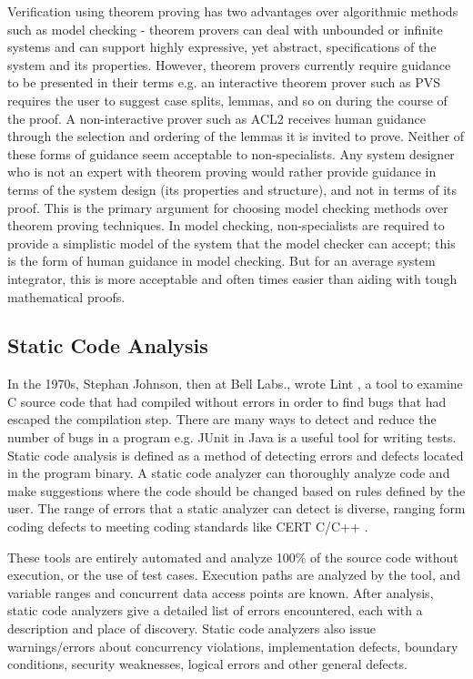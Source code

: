 Verification using theorem proving has two advantages over algorithmic methods such as model checking - theorem provers can deal with unbounded or infinite systems and can support highly expressive, yet abstract, specifications of the system and its properties. However, theorem provers currently require guidance to be presented in their terms e.g. an interactive theorem prover such as PVS \cite{owre1992pvs} requires the user to suggest case splits, lemmas, and so on during the course of the proof. A non-interactive prover such as ACL2 \cite{shelleyacl2} receives human guidance through the selection and ordering of the lemmas it is invited to prove. Neither of these forms of guidance seem acceptable to non-specialists. Any system designer who is not an expert with theorem proving would rather provide guidance in terms of the system design (its properties and structure), and not in terms of its proof. This is the primary argument for choosing model checking methods over theorem proving techniques. In model checking, non-specialists are required to provide a simplistic model of the system that the model checker can accept; this is the form of human guidance in model checking. But for an average system integrator, this is more acceptable and often times easier than aiding with tough mathematical proofs.

\subsection{Static Code Analysis}

In the 1970s, Stephan Johnson, then at Bell Labs., wrote Lint \cite{johnson1977lint}, a tool to examine C source code that had compiled without errors in order to find bugs that had escaped the compilation step. There are many ways to detect and reduce the number of bugs in a program e.g. JUnit \cite{massol2003junit} in Java is a useful tool for writing tests. Static code analysis \cite{Static_Code_Analysis} is defined as a method of detecting errors and defects located in the program binary. A static code analyzer can thoroughly analyze code and make suggestions where the code should be changed based on rules defined by the user. The range of errors that a static analyzer can detect is diverse, ranging form coding defects to meeting coding standards like CERT C/C++ \cite{seacord2005secure}. 

These tools are entirely automated and analyze 100\% of the source code without execution, or the use of test cases. Execution paths are analyzed by the tool, and variable ranges and concurrent data access points are known. After analysis, static code analyzers give a detailed list of errors encountered, each with a description and place of discovery. Static code analyzers also issue warnings/errors about concurrency violations, implementation defects, boundary conditions, security weaknesses, logical errors and other general defects. %

